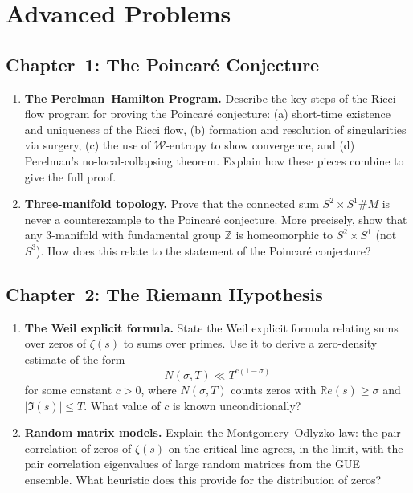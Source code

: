 \section{Advanced Problems}
\label{sec:advanced-problems}

\subsection{Chapter~1: The Poincar\'{e} Conjecture}

\begin{enumerate}[label=\textbf{A1.\arabic*.},leftmargin=2.5em]
\item \textbf{The Perelman--Hamilton Program.}
Describe the key steps of the Ricci flow program for proving the Poincar\'{e} conjecture: (a) short-time existence and uniqueness of the Ricci flow, (b) formation and resolution of singularities via surgery, (c) the use of $\mathcal{W}$-entropy to show convergence, and (d) Perelman's no-local-collapsing theorem. Explain how these pieces combine to give the full proof.

\item \textbf{Three-manifold topology.}
Prove that the connected sum $S^2 \times S^1 \# M$ is never a counterexample to the Poincar\'{e} conjecture. More precisely, show that any 3-manifold with fundamental group $\mathbb{Z}$ is homeomorphic to $S^2 \times S^1$ (not $S^3$). How does this relate to the statement of the Poincar\'{e} conjecture?
\end{enumerate}

\subsection{Chapter~2: The Riemann Hypothesis}

\begin{enumerate}[label=\textbf{A2.\arabic*.},leftmargin=2.5em]
\item \textbf{The Weil explicit formula.}
State the Weil explicit formula relating sums over zeros of $\zeta(s)$ to sums over primes. Use it to derive a zero-density estimate of the form
\[
N(\sigma, T) \ll T^{c(1-\sigma)}
\]
for some constant $c > 0$, where $N(\sigma, T)$ counts zeros with $\mathbb{R}e(s) \geq \sigma$ and $|\Im(s)| \leq T$. What value of $c$ is known unconditionally?

\item \textbf{Random matrix models.}
Explain the Montgomery--Odlyzko law: the pair correlation of zeros of $\zeta(s)$ on the critical line agrees, in the limit, with the pair correlation eigenvalues of large random matrices from the GUE ensemble. What heuristic does this provide for the distribution of zeros?
\end{enumerate}

